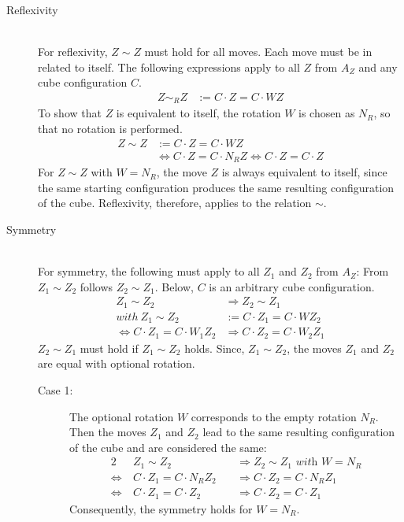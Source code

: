 \documentclass[12pt,a4paper]{article}
\theoremstyle{custom}
\begin{document}
\begin{description}

\item [Reflexivity] \ \\
For reflexivity, $Z \sim Z$ must hold for all moves. Each move must be in related to itself. The following expressions apply to all $Z$ from $A_Z$ and any cube configuration $C$.
\begin{align*}
Z \sim_R Z & := C \cdot Z = C \cdot WZ
\end{align*}
To show that $Z$ is equivalent to itself, the rotation $W$ is chosen as $N_R$, so that no rotation is performed.
\begin{align*}
Z \sim Z & := C \cdot Z = C \cdot WZ \\
\ & \Leftrightarrow C \cdot Z=C \cdot N_R Z \Leftrightarrow C \cdot Z = C \cdot Z
\end{align*}
For $Z \sim Z$ with $W=N_R$, the move $Z$ is always equivalent to itself, since the same starting configuration produces the same resulting configuration of the cube. Reflexivity, therefore, applies to the relation $\sim$.

\item [Symmetry] \ \\
For symmetry, the following must apply to all $Z_1$ and $Z_2$ from $A_Z$: From $Z_1 \sim Z_2$ follows $Z_2 \sim Z_1$. Below, $C$ is an arbitrary cube configuration.
\begin{align*}
Z_1 \sim Z_2 & \Rightarrow Z_2 \sim Z_1 \\
with \ Z_1 \sim Z_2 & := C \cdot Z_1 = C \cdot WZ_2 \\
\Leftrightarrow C \cdot Z_1 = C \cdot W_1 Z_2 & \Rightarrow C \cdot Z_2 = C \cdot W_2 Z_1
\end{align*}
$Z_2 \sim Z_1$ must hold if $Z_1 \sim Z_2$ holds. Since, $Z_1 \sim Z_2$, the moves $Z_1$ and $Z_2$ are equal with optional rotation.
\begin{description}

\item[Case 1:]
The optional rotation $W$ corresponds to the empty rotation $N_R$. Then the moves $Z_1$ and $Z_2$ lead to the same resulting configuration of the cube and are considered the same:
\begin{alignat*}{2}
& Z_1 \sim Z_2 && \Rightarrow Z_2 \sim Z_1 \textit{ with } W = N_R \\
\Leftrightarrow \ & C \cdot Z_1 = C \cdot N_R Z_2 \ && \Rightarrow C \cdot Z_2 = C \cdot N_R Z_1 \\
\Leftrightarrow \ & C \cdot Z_1 = C \cdot Z_2 && \Rightarrow C \cdot Z_2 = C \cdot Z_1
\end{alignat*}
Consequently, the symmetry holds for $W = N_R$.


\end{description}
\end{description}
\end{document}
